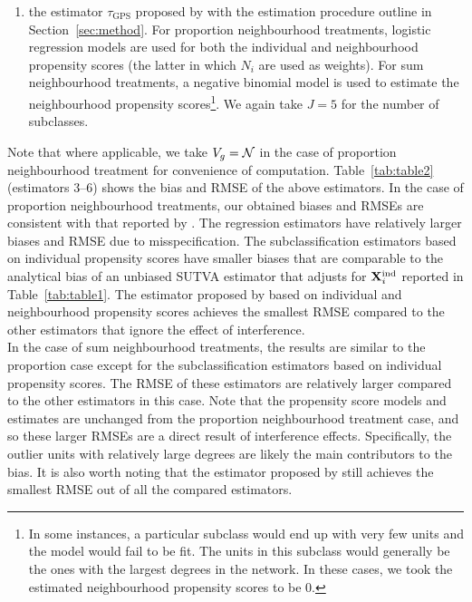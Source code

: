 \documentclass[10pt]{article}
\begin{document}
\begin{enumerate}
\item
the estimator $\tau_\text{GPS}$ proposed by \textcite{Forastiere:2021} with the estimation procedure outline in Section~\ref{sec:method}. For proportion neighbourhood treatments, logistic regression models are used for both the individual and neighbourhood propensity scores (the latter in which $N_i$ are used as weights). For sum neighbourhood treatments, a negative binomial model is used to estimate the neighbourhood propensity scores\footnote{In some instances, a particular subclass would end up with very few units and the model would fail to be fit. The units in this subclass would generally be the ones with the largest degrees in the network. In these cases, we took the estimated neighbourhood propensity scores to be 0.}. We again take $J=5$ for the number of subclasses.

\end{enumerate}
Note that where applicable, we take $V_g=\mathcal{N}$ in the case of proportion neighbourhood treatment for convenience of computation. Table~\ref{tab:table2} (estimators 3--6) shows the bias and RMSE of the above estimators. In the case of proportion neighbourhood treatments, our obtained biases and RMSEs are consistent with that reported by \textcite{Forastiere:2021}. The regression estimators have relatively larger biases and RMSE due to misspecification. The subclassification estimators based on individual propensity scores have smaller biases that are comparable to the analytical bias of an unbiased SUTVA estimator that adjusts for $\mathbf{X}^{\text{ind}}_i$ reported in Table~\ref{tab:table1}. The estimator proposed by \citeauthor{Forastiere:2021} based on individual and neighbourhood propensity scores achieves the smallest RMSE compared to the other estimators that ignore the effect of interference.
\\

In the case of sum neighbourhood treatments, the results are similar to the proportion case except for the subclassification estimators based on individual propensity scores. The RMSE of these estimators are relatively larger compared to the other estimators in this case. Note that the propensity score models and estimates are unchanged from the proportion neighbourhood treatment case, and so these larger RMSEs are a direct result of interference effects. Specifically, the outlier units with relatively large degrees are likely the main contributors to the bias. It is also worth noting that the estimator proposed by \citeauthor{Forastiere:2021} still achieves the smallest RMSE out of all the compared estimators.
\end{document}
